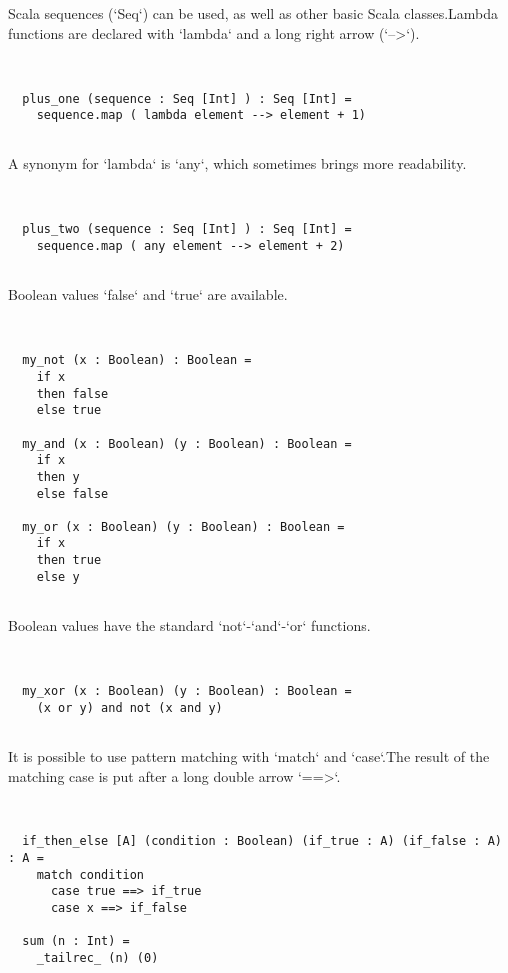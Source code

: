 \documentclass[12pt,a4paper]{article}
\begin{document}
Scala sequences (`Seq`) can be used, as well as other basic Scala classes.Lambda functions are declared with `lambda` and a long right arrow (`-->`). 


\begin{lstlisting}


  plus_one (sequence : Seq [Int] ) : Seq [Int] =
    sequence.map ( lambda element --> element + 1)


\end{lstlisting}

A synonym for `lambda` is `any`, which sometimes brings more readability. 


\begin{lstlisting}


  plus_two (sequence : Seq [Int] ) : Seq [Int] =
    sequence.map ( any element --> element + 2)


\end{lstlisting}

Boolean values `false` and `true` are available. 


\begin{lstlisting}


  my_not (x : Boolean) : Boolean =
    if x
    then false
    else true

  my_and (x : Boolean) (y : Boolean) : Boolean =
    if x
    then y
    else false

  my_or (x : Boolean) (y : Boolean) : Boolean =
    if x
    then true
    else y


\end{lstlisting}

Boolean values have the standard `not`-`and`-`or` functions. 


\begin{lstlisting}


  my_xor (x : Boolean) (y : Boolean) : Boolean =
    (x or y) and not (x and y)


\end{lstlisting}

It is possible to use pattern matching with `match` and `case`.The result of the matching case is put after a long double arrow `==>`. 


\begin{lstlisting}


  if_then_else [A] (condition : Boolean) (if_true : A) (if_false : A) : A =
    match condition
      case true ==> if_true
      case x ==> if_false

  sum (n : Int) =
    _tailrec_ (n) (0)


\end{lstlisting}
\end{document}
